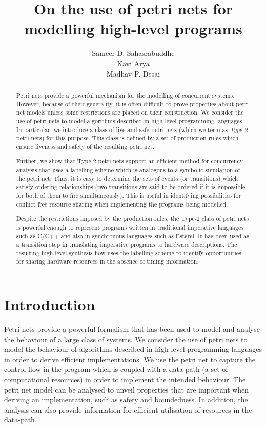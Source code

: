 \documentclass[12pt,a4paper]{article}
\title{On the use of petri nets for modelling high-level programs}
\author{Sameer D. Sahasrabuddhe \\ Kavi Arya \\ Madhav P. Desai}
\date{}
\begin{document}
\maketitle

\begin{abstract}

  Petri nets provide a powerful mechanism for the modelling of
  concurrent systems. However, because of their generality, it is
  often difficult to prove properties about petri net models unless
  some restrictions are placed on their construction. We consider the
  use of petri nets to model algorithms described in high level
  programming languages. In particular, we introduce a class of live
  and safe petri nets (which we term as {\em Type-2} petri nets) for
  this purpose. This class is defined by a set of production rules
  which ensure liveness and safety of the resulting petri net.
  
  Further, we show that Type-2 petri nets support an efficient method
  for concurrency analysis that uses a labelling scheme which is
  analogous to a symbolic simulation of the petri net. Thus, it is
  easy to determine the sets of events (or transitions) which satisfy
  ordering relationships (two transitions are said to be ordered if it
  is impossible for both of them to fire simultaneously). This is
  useful in identifying possibilities for conflict free resource
  sharing when implementing the programs being modelled.

  Despite the restrictions imposed by the production rules, the Type-2
  class of petri nets is powerful enough to represent programs written
  in traditional imperative languages such as C/C++ and also in
  synchronous languages such as Esterel. It has been used as a
  transition step in translating imperative programs to hardware
  descriptions\cite{ahir-thesis}. The resulting high-level synthesis
  flow uses the labelling scheme to identify opportunities for sharing
  hardware resources in the absence of timing information.

\end{abstract}

\section{Introduction}
\label{sec:introduction}

Petri nets provide a powerful formalism that has been used to model
and analyse the behaviour of a large class of systems. We consider the
use of petri nets to model the behaviour of algorithms described in
high-level programming languages in order to derive efficient
implementations. We use the petri net to capture the control flow in
the program which is coupled with a data-path (a set of computational
resources) in order to implement the intended behaviour. The petri net
model can be analysed to unveil properties that are important when
deriving an implementation, such as safety and boundedness. In
addition, the analysis can also provide information for efficient
utilisation of resources in the data-path.
\end{document}
